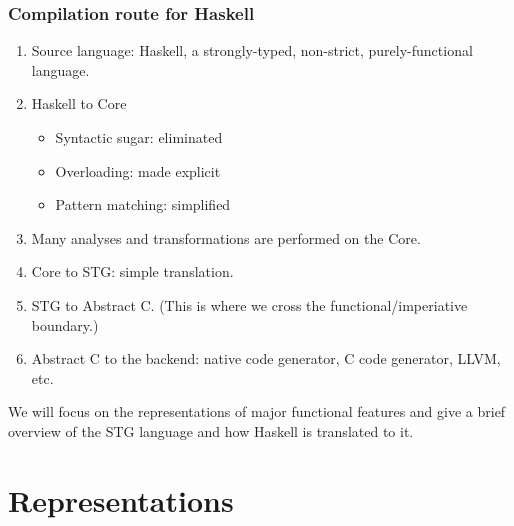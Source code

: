\documentclass{beamer}
\begin{document}
\begin{frame}
    \frametitle{Compilation route for Haskell}

    \begin{enumerate}
        \item Source language: Haskell, a strongly-typed, non-strict,
            purely-functional language.
        \item Haskell to Core
            \begin{itemize}
                \item Syntactic sugar: eliminated
                \item Overloading: made explicit
                \item Pattern matching: simplified
            \end{itemize}

        \item Many analyses and transformations are performed on the Core.

        \item Core to STG: simple translation.

        \item STG to Abstract C. (This is where we cross the
            functional/imperiative boundary.)

        \item Abstract C to the backend: native code generator, C code
            generator, LLVM, etc.
    \end{enumerate}

    We will focus on the representations of major functional features and give
    a brief overview of the STG language and how Haskell is translated to it.
\end{frame}

\section{Representations}
\end{document}
